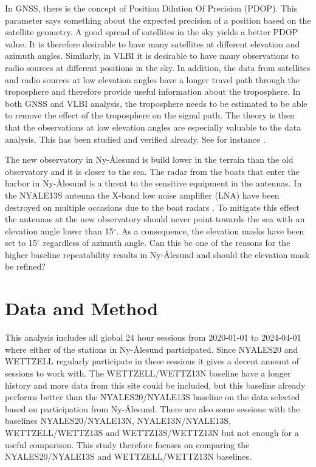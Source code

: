 \documentclass[twoside=semi,fontsize=12pt,paper=a4,titlepage=on]{kv_article}
\begin{document}
\fussy
In GNSS, there is the concept of Position Dilution Of Precision (PDOP). This parameter says something about the expected precision of a position based on the satellite geometry. A good spread of satellites in the sky yields a better PDOP value. It is therefore desirable to have many satellites at different elevation and azimuth angles. Similarly, in VLBI it is desirable to have many observations to radio sources at different positions in the sky. In addition, the data from satellites and radio sources at low elevation angles have a longer travel path through the troposphere and therefore provide useful information about the troposphere. In both GNSS and VLBI analysis, the troposphere needs to be estimated to be able to remove the effect of the troposphere on the signal path. The theory is then that the observations at low elevation angles are especially valuable to the data analysis. This has been studied and verified already. See for instance \cite{teke2008}. %

The new observatory in Ny-Ålesund is build lower in the terrain than the old observatory and it is closer to the sea. The radar from the boats that enter the harbor in Ny-Ålesund is a threat to the sensitive equipment in the antennas. In the NYALE13S antenna the X-band low noise amplifier (LNA) have been destroyed on multiple occasions due to the boat radars \cite{perez2019}. To mitigate this effect the antennas at the new observatory should never point towards the sea with an elevation angle lower than 15$^\circ$. As a consequence, the elevation masks have been set to 15$^\circ$ regardless of azimuth angle. Can this be one of the reasons for the higher baseline repeatability results in Ny-Ålesund and should the elevation mask be refined?

\section{Data and Method}
\label{sec:data_and_method}
This analysis includes all global 24 hour sessions from 2020-01-01 to 2024-04-01 where either of the stations in Ny-Ålesund participated. Since NYALES20 and WETTZELL regularly participate in these sessions it gives a decent amount of sessions to work with. The WETTZELL/WETTZ13N baseline have a longer history and more data from this site could be included, but this baseline already performs better than the NYALES20/NYALE13S baseline on the data selected based on participation from Ny-Ålesund. There are also some sessions with the baselines NYALES20/NYALE13N, NYALE13N/NYALE13S, WETTZELL/WETTZ13S and WETTZ13S/WETTZ13N but not enough for a useful comparison. This study therefore focuses on comparing the NYALES20/NYALE13S and WETTZELL/WETTZ13N baselines. 
\end{document}
